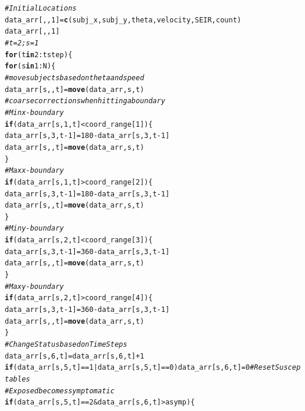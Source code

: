 \documentclass{article}\usepackage[]{graphicx}\usepackage[]{color}
\makeatletter
\newcommand{\hlnum}[1]{\textcolor[rgb]{0.686,0.059,0.569}{#1}}%
\newcommand{\hlcom}[1]{\textcolor[rgb]{0.678,0.584,0.686}{\textit{#1}}}%
\newcommand{\hlopt}[1]{\textcolor[rgb]{0,0,0}{#1}}%
\newcommand{\hlstd}[1]{\textcolor[rgb]{0.345,0.345,0.345}{#1}}%
\newcommand{\hlkwa}[1]{\textcolor[rgb]{0.161,0.373,0.58}{\textbf{#1}}}%
\newcommand{\hlkwb}[1]{\textcolor[rgb]{0.69,0.353,0.396}{#1}}%
\newcommand{\hlkwd}[1]{\textcolor[rgb]{0.737,0.353,0.396}{\textbf{#1}}}%
\newenvironment{kframe}{%
 \def\at@end@of@kframe{}%
 \ifinner\ifhmode%
  \def\at@end@of@kframe{\end{minipage}}%
  \begin{minipage}{\columnwidth}%
 \fi\fi%
 \def\FrameCommand##1{\hskip\@totalleftmargin \hskip-\fboxsep
 \colorbox{shadecolor}{##1}\hskip-\fboxsep
     \hskip-\linewidth \hskip-\@totalleftmargin \hskip\columnwidth}%
 \MakeFramed {\advance\hsize-\width
   \@totalleftmargin\z@ \linewidth\hsize
   \@setminipage}}%
 {\par\unskip\endMakeFramed%
 \at@end@of@kframe}
\newenvironment{knitrout}{}{} %
\makeatother
\begin{document}
\begin{knitrout}
\begin{kframe}
\begin{alltt}
\hlcom{# Initial Locations}
\hlstd{data_arr[,,}\hlnum{1}\hlstd{]} \hlkwb{=} \hlkwd{c}\hlstd{(subj_x, subj_y, theta, velocity, SEIR, count)}
\hlstd{data_arr[,,}\hlnum{1}\hlstd{]}
\hlcom{# t = 2; s=1}
\hlkwa{for}\hlstd{(t} \hlkwa{in} \hlnum{2}\hlopt{:}\hlstd{tstep)\{}
  \hlkwa{for}\hlstd{(s} \hlkwa{in} \hlnum{1}\hlopt{:}\hlstd{N)\{}
    \hlcom{# move subjects based on theta and speed}
    \hlstd{data_arr[s,,t]} \hlkwb{=} \hlkwd{move}\hlstd{(data_arr, s, t)}
    \hlcom{# coarse corrections when hitting a boundary}
    \hlcom{# Min x-boundary}
    \hlkwa{if}\hlstd{(data_arr[s,}\hlnum{1}\hlstd{,t]} \hlopt{<} \hlstd{coord_range[}\hlnum{1}\hlstd{])\{}
      \hlstd{data_arr[s,}\hlnum{3}\hlstd{,t}\hlopt{-}\hlnum{1}\hlstd{]}\hlkwb{=}\hlnum{180}\hlopt{-}\hlstd{data_arr[s,}\hlnum{3}\hlstd{,t}\hlopt{-}\hlnum{1}\hlstd{]}
      \hlstd{data_arr[s,,t]} \hlkwb{=} \hlkwd{move}\hlstd{(data_arr, s, t)}
    \hlstd{\}}
    \hlcom{#Max x-boundary}
    \hlkwa{if}\hlstd{(data_arr[s,}\hlnum{1}\hlstd{,t]} \hlopt{>} \hlstd{coord_range[}\hlnum{2}\hlstd{])\{}
      \hlstd{data_arr[s,}\hlnum{3}\hlstd{,t}\hlopt{-}\hlnum{1}\hlstd{]}\hlkwb{=}\hlnum{180}\hlopt{-}\hlstd{data_arr[s,}\hlnum{3}\hlstd{,t}\hlopt{-}\hlnum{1}\hlstd{]}
      \hlstd{data_arr[s,,t]} \hlkwb{=} \hlkwd{move}\hlstd{(data_arr, s, t)}
    \hlstd{\}}
    \hlcom{#Min y-boundary}
    \hlkwa{if}\hlstd{(data_arr[s,}\hlnum{2}\hlstd{,t]} \hlopt{<} \hlstd{coord_range[}\hlnum{3}\hlstd{])\{}
      \hlstd{data_arr[s,}\hlnum{3}\hlstd{,t}\hlopt{-}\hlnum{1}\hlstd{]}\hlkwb{=}\hlnum{360}\hlopt{-}\hlstd{data_arr[s,}\hlnum{3}\hlstd{,t}\hlopt{-}\hlnum{1}\hlstd{]}
      \hlstd{data_arr[s,,t]} \hlkwb{=} \hlkwd{move}\hlstd{(data_arr, s, t)}
    \hlstd{\}}
    \hlcom{#Max y-boundary}
    \hlkwa{if}\hlstd{(data_arr[s,}\hlnum{2}\hlstd{,t]} \hlopt{>} \hlstd{coord_range[}\hlnum{4}\hlstd{])\{}
      \hlstd{data_arr[s,}\hlnum{3}\hlstd{,t}\hlopt{-}\hlnum{1}\hlstd{]}\hlkwb{=}\hlnum{360}\hlopt{-}\hlstd{data_arr[s,}\hlnum{3}\hlstd{,t}\hlopt{-}\hlnum{1}\hlstd{]}
      \hlstd{data_arr[s,,t]} \hlkwb{=} \hlkwd{move}\hlstd{(data_arr, s, t)}
    \hlstd{\}}
    \hlcom{# Change Status based on Time Steps}
    \hlstd{data_arr[s,}\hlnum{6}\hlstd{,t]} \hlkwb{=} \hlstd{data_arr[s,}\hlnum{6}\hlstd{,t]} \hlopt{+} \hlnum{1}
    \hlkwa{if}\hlstd{(data_arr[s,}\hlnum{5}\hlstd{,t]}\hlopt{==}\hlnum{1} \hlopt{|} \hlstd{data_arr[s,}\hlnum{5}\hlstd{,t]}\hlopt{==}\hlnum{0}\hlstd{) data_arr[s,}\hlnum{6}\hlstd{,t]}\hlkwb{=}\hlnum{0} \hlcom{# Reset Susceptables  }
   \hlcom{# Exposed becomes symptomatic}
  \hlkwa{if}\hlstd{(data_arr[s,}\hlnum{5}\hlstd{,t]}\hlopt{==}\hlnum{2} \hlopt{&} \hlstd{data_arr[s,}\hlnum{6}\hlstd{,t]} \hlopt{>} \hlstd{asymp)\{}

\end{alltt}
\end{kframe}
\end{knitrout}
\end{document}
